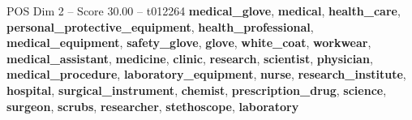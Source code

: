 \begin{textsample}{POS Dim 2 – Score 30.00 – t012264}  \label{ex:f2_pos_009}
\textbf{medical\_glove}, \textbf{medical}, \textbf{health\_care}, \textbf{personal\_protective\_equipment}, \textbf{health\_professional}, \textbf{medical\_equipment}, \textbf{safety\_glove}, \textbf{glove}, \textbf{white\_coat}, \textbf{workwear}, \textbf{medical\_assistant}, \textbf{medicine}, \textbf{clinic}, \textbf{research}, \textbf{scientist}, \textbf{physician}, \textbf{medical\_procedure}, \textbf{laboratory\_equipment}, \textbf{nurse}, \textbf{research\_institute}, \textbf{hospital}, \textbf{surgical\_instrument}, \textbf{chemist}, \textbf{prescription\_drug}, \textbf{science}, \textbf{surgeon}, \textbf{scrubs}, \textbf{researcher}, \textbf{stethoscope}, \textbf{laboratory}

\end{textsample}
